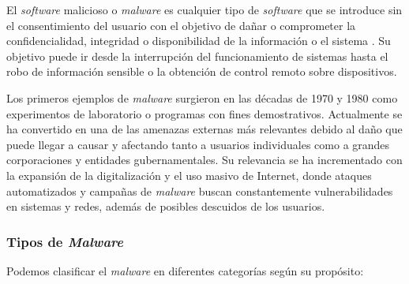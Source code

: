 El \textit{software} malicioso o \textit{malware} es cualquier tipo de \textit{software} que se introduce sin el consentimiento del usuario con el objetivo de dañar o comprometer la confidencialidad, integridad o disponibilidad de la información o el sistema \cite{def_malware}. Su objetivo puede ir desde la interrupción del funcionamiento de sistemas hasta el robo de información sensible o la obtención de control remoto sobre dispositivos.

\vspace{1em}

Los primeros ejemplos de \textit{malware} surgieron en las décadas de 1970 y 1980 como experimentos de laboratorio o programas con fines demostrativos. Actualmente se ha convertido en una de las amenazas externas más relevantes debido al daño que puede llegar a causar y afectando tanto a usuarios individuales como a grandes corporaciones y entidades gubernamentales. Su relevancia se ha incrementado con la expansión de la digitalización y el uso masivo de Internet, donde ataques automatizados y campañas de \textit{malware} buscan constantemente vulnerabilidades en sistemas y redes, además de posibles descuidos de los usuarios.

\subsubsection{Tipos de \textit{Malware}}
\label{subsubsec:tipos_malware}

Podemos clasificar el \textit{malware} en diferentes categorías \cite{categoriamw} según su propósito:

